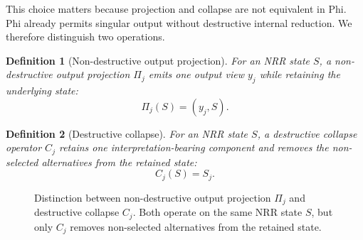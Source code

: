 \documentclass[11pt,a4paper]{article}
\newtheorem{definition}{Definition}
\begin{document}
This choice matters because projection and collapse are not equivalent in Phi. Phi already permits singular output without destructive internal reduction. We therefore distinguish two operations.

\begin{definition}[Non-destructive output projection]
For an NRR state $S$, a non-destructive output projection $\Pi_j$ emits one output view $y_j$ while retaining the underlying state:
\begin{equation}
\Pi_j(S) = (y_j, S).
\end{equation}
\end{definition}

\begin{definition}[Destructive collapse]
For an NRR state $S$, a destructive collapse operator $C_j$ retains one interpretation-bearing component and removes the non-selected alternatives from the retained state:
\begin{equation}
C_j(S) = S_j.
\end{equation}
\end{definition}
\begin{figure}[t]
\centering
{}
\caption{Distinction between non-destructive output projection $\Pi_j$ and destructive collapse $C_j$. Both operate on the same NRR state $S$, but only $C_j$ removes non-selected alternatives from the retained state.}
\label{fig:projection_vs_collapse}
\end{figure}
\end{document}
